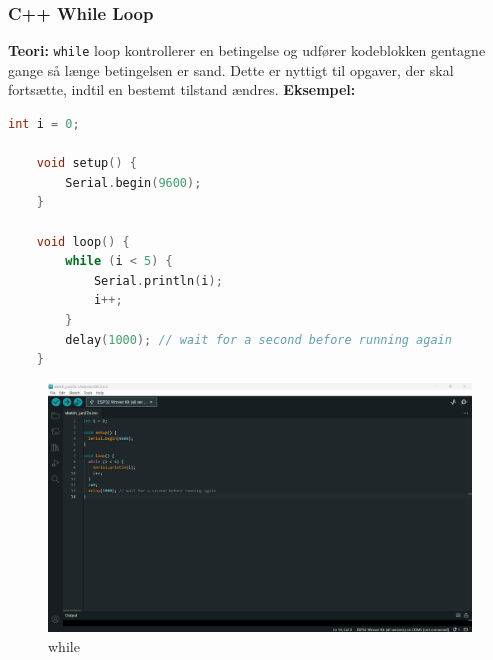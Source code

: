 \subsubsection{C++ While Loop}
\textbf{Teori:} \texttt{while} loop kontrollerer en betingelse og udfører kodeblokken gentagne gange så længe betingelsen er sand. Dette er nyttigt til opgaver, der skal fortsætte, indtil en bestemt tilstand ændres.
\newline\newline
\noindent\textbf{Eksempel:}
\begin{lstlisting}[language=C++]
	int i = 0;
	
	void setup() {
		Serial.begin(9600);
	}
	
	void loop() {
		while (i < 5) {
			Serial.println(i);
			i++;
		}
		delay(1000); // wait for a second before running again
	}
\end{lstlisting}
\begin{figure}[h!]
	\centering
	\includegraphics[width=\textwidth]{fig/fig9.png}
	\caption{while}
	\label{fig:9}
\end{figure}

